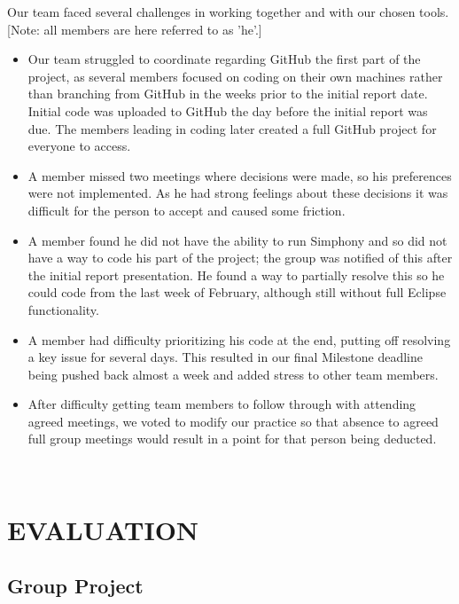\documentclass[11pt]{article}
\begin{document}
\begin{enumerate}
Our team faced several challenges in working together and with our chosen tools. [Note: all members are here referred to as \textquoteright he\textquoteright .] 

\begin{itemize}\itemsep0pt
\item Our team struggled to coordinate regarding GitHub the first part of the project, as several members focused on coding on their own machines rather than branching from GitHub in the weeks prior to the initial report date. Initial code was uploaded to GitHub the day before the initial report was due. The members leading in coding later created a full GitHub project for everyone to access. 
\\
\item A member missed two meetings where decisions were made, so his preferences were not implemented. As he had strong feelings about these decisions it was difficult for the person to accept and caused some friction.
\\
\item A member found he did not have the ability to run Simphony and so did not have a way to code his part of the project; the group was notified of this after the initial report presentation. He found a way to partially resolve this so he could code from the last week of February, although still without full Eclipse functionality. 
\\
\item A member had difficulty prioritizing his code at the end, putting off resolving a key issue for several days. This resulted in our final Milestone deadline being pushed back almost a week and added stress to other team members.
\\
\item After difficulty getting team members to follow through with attending agreed meetings, we voted to modify our practice so that absence to agreed full group meetings would result in a point for that person being deducted.
\end{itemize}
\\


\section{EVALUATION}


\subsection{Group Project}


\end{enumerate}
\end{document}

